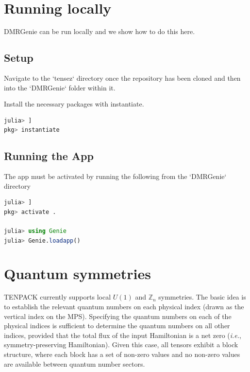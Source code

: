 \documentclass{juliacon}
\begin{document}
\begin{appendix}


\section{Running locally}

DMRGenie can be run locally and we show how to do this here.

\subsection{Setup}

Navigate to the `tensez` directory once the repository has been cloned and then into the `DMRGenie` folder within it.

Install the necessary packages with instantiate.

\begin{lstlisting}[language = Julia]
julia> ] 
pkg> instantiate
\end{lstlisting}

\subsection{Running the App}

The app must be activated by running the following from the `DMRGenie` directory

\begin{lstlisting}[language = Julia]
julia> ] 
pkg> activate .

julia> using Genie
julia> Genie.loadapp()
\end{lstlisting}

\section{Quantum symmetries}
\label{qsymmetries}

TENPACK currently supports local $U(1)$ and $\mathbb{Z}_n$ symmetries. The basic idea is to establish the relevant quantum numbers on each physical index (drawn as the vertical index on the MPS). Specifying the quantum numbers on each of the physical indices is sufficient to determine the quantum numbers on all other indices, provided that the total flux of the input Hamiltonian is a net zero ({\it i.e.}, symmetry-preserving Hamiltonian). Given this case, all tensors exhibit a block structure, where each block has a set of non-zero values and no non-zero values are available between quantum number sectors.


\end{appendix}
\end{document}
